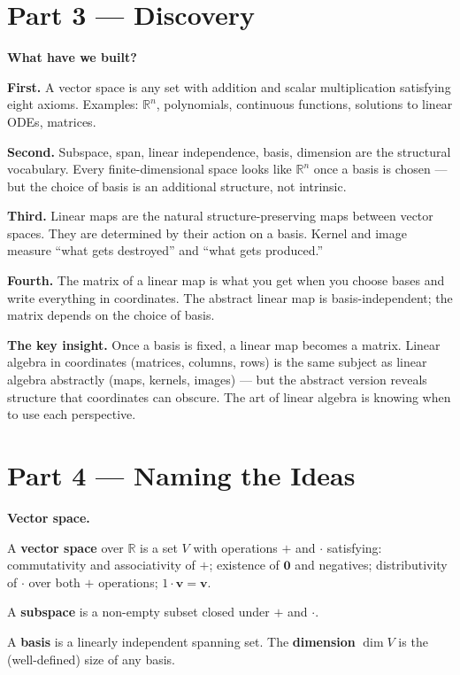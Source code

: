 \documentclass[12pt, a4paper]{article}
\begin{document}
\section{Part 3 \texorpdfstring{---}{--} Discovery}

\begin{discoverybox}
\textbf{What have we built?}

\textbf{First.} A vector space is any set with addition and scalar multiplication satisfying eight axioms. Examples: $\mathbb{R}^n$, polynomials, continuous functions, solutions to linear ODEs, matrices.

\textbf{Second.} Subspace, span, linear independence, basis, dimension are the structural vocabulary. Every finite-dimensional space looks like $\mathbb{R}^n$ once a basis is chosen --- but the choice of basis is an additional structure, not intrinsic.

\textbf{Third.} Linear maps are the natural structure-preserving maps between vector spaces. They are determined by their action on a basis. Kernel and image measure ``what gets destroyed'' and ``what gets produced.''

\textbf{Fourth.} The matrix of a linear map is what you get when you choose bases and write everything in coordinates. The abstract linear map is basis-independent; the matrix depends on the choice of basis.

\medskip
\textbf{The key insight.} Once a basis is fixed, a linear map becomes a matrix. Linear algebra in coordinates (matrices, columns, rows) is the same subject as linear algebra abstractly (maps, kernels, images) --- but the abstract version reveals structure that coordinates can obscure. The art of linear algebra is knowing when to use each perspective.
\end{discoverybox}

\section{Part 4 \texorpdfstring{---}{--} Naming the Ideas}

\begin{namebox}
\textbf{Vector space.}

A \textbf{vector space} over $\mathbb{R}$ is a set $V$ with operations $+$ and $\cdot$ satisfying: commutativity and associativity of $+$; existence of $\mathbf{0}$ and negatives; distributivity of $\cdot$ over both $+$ operations; $1\cdot\mathbf{v} = \mathbf{v}$.

A \textbf{subspace} is a non-empty subset closed under $+$ and $\cdot$.

A \textbf{basis} is a linearly independent spanning set. The \textbf{dimension} $\dim V$ is the (well-defined) size of any basis.
\end{namebox}
\end{document}
